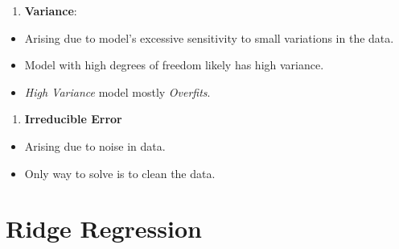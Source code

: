 \documentclass[
]{report}
\providecommand{\tightlist}{%
  \setlength{\itemsep}{0pt}\setlength{\parskip}{0pt}}\usepackage{longtable,booktabs,array}
\begin{document}
\begin{enumerate}
\def\labelenumi{\arabic{enumi}.}
\setcounter{enumi}{1}
\tightlist
\item
  \textbf{Variance}:
\end{enumerate}

\begin{itemize}
\tightlist
\item
  Arising due to model's excessive sensitivity to small variations in
  the data.
\item
  Model with high degrees of freedom likely has high variance.
\item
  \emph{High Variance} model mostly \emph{Overfits}.
\end{itemize}

\begin{enumerate}
\def\labelenumi{\arabic{enumi}.}
\setcounter{enumi}{2}
\tightlist
\item
  \textbf{Irreducible Error}
\end{enumerate}

\begin{itemize}
\tightlist
\item
  Arising due to noise in data.
\item
  Only way to solve is to clean the data.
\end{itemize}

\hypertarget{ridge-regression}{%
\chapter{Ridge Regression}\label{ridge-regression}}
\end{document}
